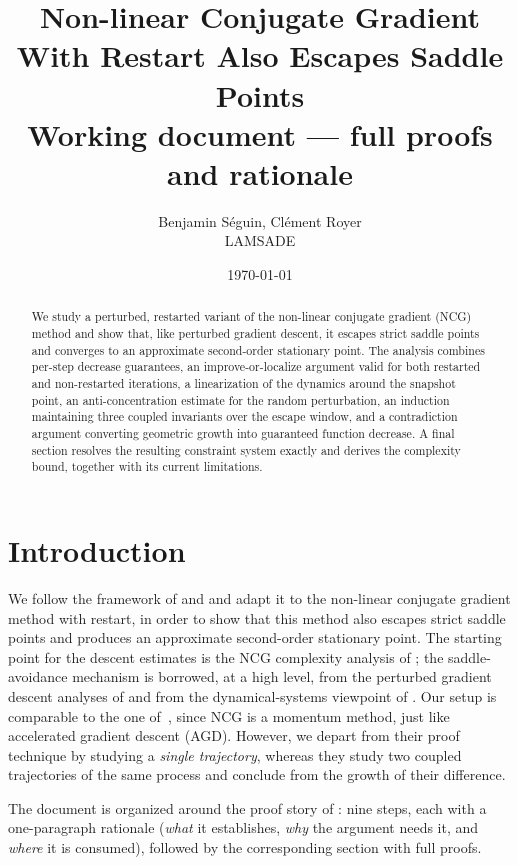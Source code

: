 \documentclass[11pt,a4paper]{article}
\title{Non-linear Conjugate Gradient With Restart Also Escapes Saddle Points\\
\large Working document --- full proofs and rationale}
\author{Benjamin S\'eguin, Cl\'ement Royer \\ \small LAMSADE}
\date{\today}
\theoremstyle{plain}
\theoremstyle{definition}
\begin{document}
\maketitle

\begin{abstract}
We study a perturbed, restarted variant of the non-linear conjugate gradient (NCG)
method and show that, like perturbed gradient descent, it escapes strict saddle
points and converges to an approximate second-order stationary point. The analysis
combines per-step decrease guarantees, an improve-or-localize argument valid for both
restarted and non-restarted iterations, a linearization of the dynamics around the
snapshot point, an anti-concentration estimate for the random perturbation, an
induction maintaining three coupled invariants over the escape window, and a
contradiction argument converting geometric growth into guaranteed function decrease.
A final section resolves the resulting constraint system exactly and derives the
complexity bound, together with its current limitations.
\end{abstract}

\tableofcontents

\section{Introduction}\label{sec:intro}
We follow the framework of \cite{pmlr-v70-jin17a} and \cite{pmlr-v75-jin18a} and
adapt it to the non-linear conjugate gradient method with restart, in order to show
that this method also escapes strict saddle points and produces an approximate
second-order stationary point. The starting point for the descent estimates is the
NCG complexity analysis of \cite{RoyerChan2022}; the saddle-avoidance
mechanism is borrowed, at a high level, from the perturbed gradient descent analyses of
\cite{pmlr-v70-jin17a,pmlr-v75-jin18a} and from the dynamical-systems viewpoint of
\cite{lee2019}. Our setup is comparable to the one of~\cite{pmlr-v75-jin18a}, since
NCG is a momentum method, just like accelerated gradient descent (AGD).
However, we depart from their proof technique by studying a \emph{single trajectory},
whereas they study two coupled trajectories of the same process and conclude from
the growth of their difference.

The document is organized around the proof story of : nine steps,
each with a one-paragraph rationale (\emph{what} it establishes, \emph{why} the
argument needs it, and \emph{where} it is consumed), followed by the corresponding
section with full proofs.
\end{document}
